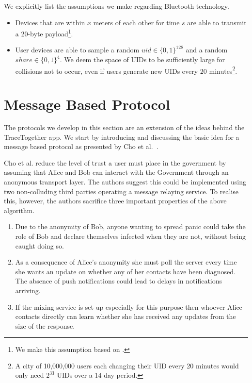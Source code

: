 \documentclass{article}
\begin{document}
We explicitly list the assumptions we make regarding Bluetooth technology.

\begin{itemize}
    \item Devices that are within $x$ meters of each other for time $s$ are able to transmit a 20-byte payload\footnote{We make this assumption based on \cite{herrera2016indoor}.}. 
    \item User devices are able to sample a random $uid  \in \{0,1\}^{128}$ and a random $\mathit{share} \in \{0,1\}^4$. We deem the space of UIDs to be sufficiently large for collisions not to occur, even if users generate new UIDs every 20 minutes\footnote{A city of 10,000,000 users each changing their UID every 20 minutes would only need $2^{33}$ UIDs over a 14 day period.
    }.
\end{itemize}


\section{Message Based Protocol}\label{sec:message_protocol}

The protocols we develop in this section are an extension of the ideas behind the TraceTogether app. We start by introducing and discussing the basic idea for a message based protocol as presented by Cho et al.~\cite{DBLP:journals/corr/abs-2003-11511}.

Cho et al. reduce the level of trust a user must place in the government by assuming that Alice and Bob can interact with the Government through an anonymous transport layer. The authors suggest this could be implemented using two non-colluding third parties operating a message relaying service. To realise this, however, the authors sacrifice three important properties of the above algorithm.
\begin{enumerate}
    \item Due to the anonymity of Bob, anyone wanting to spread panic could take the role of Bob and declare themselves infected when they are not, without being caught doing so.
    \item As a consequence of Alice's anonymity she must poll the server every time she wants an update on whether any of her contacts have been diagnosed. The absence of push notifications could lead to delays in notifications arriving.
    \item If the mixing service is set up especially for this purpose then whoever Alice contacts directly can learn whether she has received any updates from the size of the response.
\end{enumerate}
 
\end{document}
